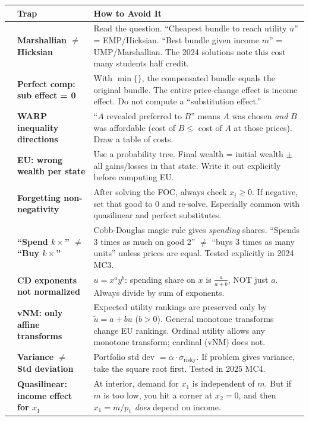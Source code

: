 \documentclass[10pt]{article}
\begin{document}
\renewcommand{\arraystretch}{1.25}
\begin{tabularx}{\textwidth}{>{\centering\arraybackslash}p{0.4cm} >{\raggedright\arraybackslash}p{4cm} >{\raggedright\arraybackslash}X}
\toprule
& \textbf{Trap} & \textbf{How to Avoid It} \\
\midrule
1 & \textbf{Marshallian $\neq$ Hicksian} & Read the question. ``Cheapest bundle to reach utility $\bar{u}$'' = EMP/Hicksian. ``Best bundle given income $m$'' = UMP/Marshallian. The 2024 solutions note this cost many students half credit. \\
2 & \textbf{Perfect comp: sub effect = 0} & With $\min\{\}$, the compensated bundle equals the original bundle. The entire price-change effect is income effect. Do not compute a ``substitution effect.'' \\
3 & \textbf{WARP inequality directions} & ``$A$ revealed preferred to $B$'' means $A$ was chosen \emph{and} $B$ was affordable (cost of $B \leq$ cost of $A$ at those prices). Draw a table of costs. \\
4 & \textbf{EU: wrong wealth per state} & Use a probability tree. Final wealth = initial wealth $\pm$ all gains/losses in that state. Write it out explicitly before computing EU. \\
5 & \textbf{Forgetting non-negativity} & After solving the FOC, always check $x_i \geq 0$. If negative, set that good to 0 and re-solve. Especially common with quasilinear and perfect substitutes. \\
6 & \textbf{``Spend $k\times$'' $\neq$ ``Buy $k\times$''} & Cobb-Douglas magic rule gives \emph{spending} shares. ``Spends 3 times as much on good 2'' $\neq$ ``buys 3 times as many units'' unless prices are equal. Tested explicitly in 2024 MC3. \\
7 & \textbf{CD exponents not normalized} & $u = x^a y^b$: spending share on $x$ is $\frac{a}{a+b}$, NOT just $a$. Always divide by sum of exponents. \\
8 & \textbf{vNM: only affine transforms} & Expected utility rankings are preserved only by $\tilde{u} = a + bu$ ($b > 0$). General monotone transforms change EU rankings. Ordinal utility allows any monotone transform; cardinal (vNM) does not. \\
9 & \textbf{Variance $\neq$ Std deviation} & Portfolio std dev $= \alpha \cdot \sigma_{\text{risky}}$. If problem gives variance, take the square root first. Tested in 2025 MC4. \\
10 & \textbf{Quasilinear: income effect for $x_1$} & At interior, demand for $x_1$ is independent of $m$. But if $m$ is too low, you hit a corner at $x_2 = 0$, and then $x_1 = m/p_1$ \emph{does} depend on income. \\

\end{tabularx}
\end{document}
